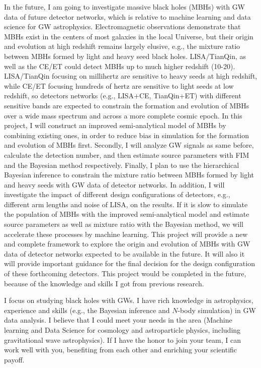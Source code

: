 \documentclass[12pt,a4paper,sans]{article}%
\begin{document}
In the future, I am going to investigate massive black holes (MBHs) with GW data of future detector networks, which is
relative to machine learning and data science for GW astrophysics. Electromagnetic
observations demonstrate that MBHs exist in the centers of most
galaxies in the local Universe, but their origin and evolution at high redshift remains largely
elusive, e.g., the mixture ratio between MBHs formed by light and heavy seed black holes. LISA/TianQin, as well as the
CE/ET could detect MBHs up to much higher
redshift (10-20). LISA/TianQin focusing on millihertz are sensitive to heavy seeds at high redshift, while CE/ET focusing
hundreds of hertz are sensitive to light seeds at low redshift, so detectors networks (e.g., LISA+CE, TianQin+ET) with different sensitive bands are expected to
constrain the formation and evolution of MBHs over a wide mass spectrum and across a more complete cosmic
epoch. In this project, I will construct an improved semi-analytical model of MBHs by combining
existing ones, in order to reduce bias in simulation for the formation and evolution of MBHs first.
Secondly, I will analyze GW signals as same before, calculate the detection number, and then estimate source parameters
with FIM and the
Bayesian method respectively. Finally, I plan to use the hierarchical Bayesian inference to constrain the mixture ratio
between MBHs formed by light and heavy seeds with GW data of detector networks. In addition, I will investigate the
impact of different design configurations of
detectors, e.g., different arm lengths and noise of LISA, on the results. If it is slow to simulate the population of
MBHs with the improved
semi-analytical model and estimate source parameters as well as mixture ratio with the Bayesian method, we will
accelerate these processes by machine learning. This project will provide a new and complete framework to explore the
origin and evolution of MBHs with GW data of detector networks expected to be
available in the future. It will also it will provide important guidance for the final decision for the design
configuration of these forthcoming detectors. This project would be completed in the future, because of the knowledge
and skills I got from previous research.

I focus on studying black holes with GWs. I have rich knowledge in astrophysics, experience and skills (e.g., the Bayesian
inference and $N$-body simulation) in GW
data analysis. I believe that I could meet your needs in the area (Machine learning and Data Science for cosmology and astroparticle
physics, including gravitational wave astrophysics). If I have the honor to join your team, I can work well with you, benefiting from each
other and enriching your scientific payoff. 
\end{document}
